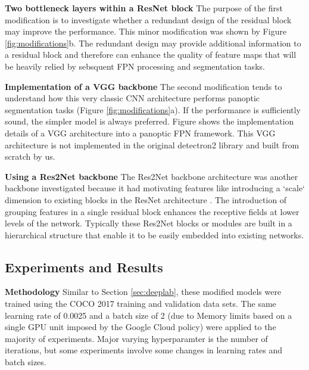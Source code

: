 \documentclass[10pt,twocolumn,letterpaper]{article}
\begin{document}
\textbf{Two bottleneck layers within a ResNet block}  The purpose of the first modification is to investigate whether a redundant design of the residual block may improve the performance. This minor modification was shown by Figure \ref{fig:modifications}b. The redundant design may provide additional information to a residual block and therefore can enhance the quality of feature maps that will be heavily relied by sebsquent FPN processing and segmentation tasks. 

\textbf{Implementation of a VGG backbone}  The second modification tends to understand how this very classic CNN architecture performs panoptic segmentation tasks (Figure \ref{fig:modifications}a). If the performance is sufficiently sound, the simpler model is always preferred. Figure shows the implementation details of a VGG architecture into a panoptic FPN framework. This VGG architecture is not implemented in the original detectron2 library and built from scratch by us.  


\textbf{Using a Res2Net backbone} The Res2Net backbone architecture was another backbone investigated because it had motivating features like introducing a `scale` dimension to existing blocks in the ResNet architecture \cite{gao2019res2net}. The introduction of grouping features in a single residual block enhances the receptive fields at lower levels of the network. Typically these Res2Net blocks or modules are built in a hierarchical structure that enable it to be easily embedded into existing networks. 


\subsection{Experiments and Results}



\textbf{Methodology} Similar to Section \ref{sec:deeplab}, these modified models were trained using the COCO 2017 training and validation data sets. The same learning rate of 0.0025 and a batch size of 2 (due to Memory limits based on a single GPU unit imposed by the Google Cloud policy) were applied to the majority of experiments. Major varying hyperparamter is the number of iterations, but some experiments involve some changes in learning rates and batch sizes. 
\end{document}
